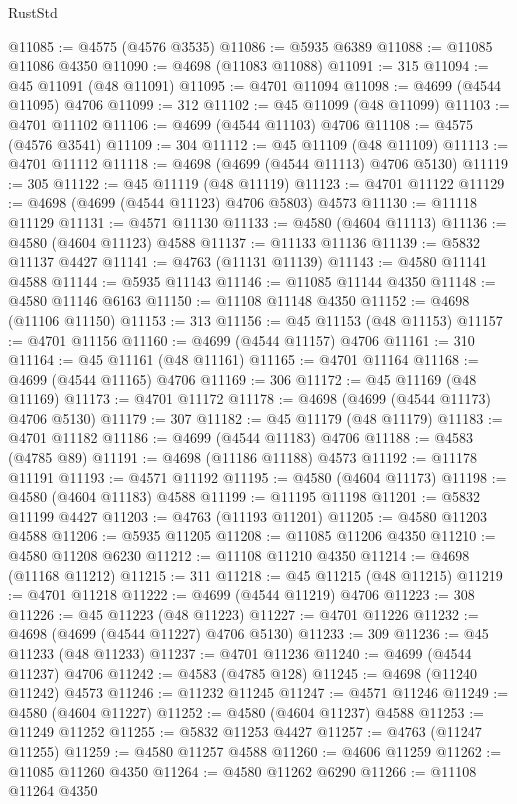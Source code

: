 \begin{lexlean}{RustStd}
\begin{coremodule}
@11085 := @4575 (@4576 @3535)
@11086 := @5935 @6389
@11088 := @11085 @11086 @4350
@11090 := @4698 (@11083 @11088)
@11091 := 315
@11094 := @45 @11091 (@48 @11091)
@11095 := @4701 @11094
@11098 := @4699 (@4544 @11095) @4706
@11099 := 312
@11102 := @45 @11099 (@48 @11099)
@11103 := @4701 @11102
@11106 := @4699 (@4544 @11103) @4706
@11108 := @4575 (@4576 @3541)
@11109 := 304
@11112 := @45 @11109 (@48 @11109)
@11113 := @4701 @11112
@11118 := @4698 (@4699 (@4544 @11113) @4706 @5130)
@11119 := 305
@11122 := @45 @11119 (@48 @11119)
@11123 := @4701 @11122
@11129 := @4698 (@4699 (@4544 @11123) @4706 @5803) @4573
@11130 := @11118 @11129
@11131 := @4571 @11130
@11133 := @4580 (@4604 @11113)
@11136 := @4580 (@4604 @11123) @4588
@11137 := @11133 @11136
@11139 := @5832 @11137 @4427
@11141 := @4763 (@11131 @11139)
@11143 := @4580 @11141 @4588
@11144 := @5935 @11143
@11146 := @11085 @11144 @4350
@11148 := @4580 @11146 @6163
@11150 := @11108 @11148 @4350
@11152 := @4698 (@11106 @11150)
@11153 := 313
@11156 := @45 @11153 (@48 @11153)
@11157 := @4701 @11156
@11160 := @4699 (@4544 @11157) @4706
@11161 := 310
@11164 := @45 @11161 (@48 @11161)
@11165 := @4701 @11164
@11168 := @4699 (@4544 @11165) @4706
@11169 := 306
@11172 := @45 @11169 (@48 @11169)
@11173 := @4701 @11172
@11178 := @4698 (@4699 (@4544 @11173) @4706 @5130)
@11179 := 307
@11182 := @45 @11179 (@48 @11179)
@11183 := @4701 @11182
@11186 := @4699 (@4544 @11183) @4706
@11188 := @4583 (@4785 @89)
@11191 := @4698 (@11186 @11188) @4573
@11192 := @11178 @11191
@11193 := @4571 @11192
@11195 := @4580 (@4604 @11173)
@11198 := @4580 (@4604 @11183) @4588
@11199 := @11195 @11198
@11201 := @5832 @11199 @4427
@11203 := @4763 (@11193 @11201)
@11205 := @4580 @11203 @4588
@11206 := @5935 @11205
@11208 := @11085 @11206 @4350
@11210 := @4580 @11208 @6230
@11212 := @11108 @11210 @4350
@11214 := @4698 (@11168 @11212)
@11215 := 311
@11218 := @45 @11215 (@48 @11215)
@11219 := @4701 @11218
@11222 := @4699 (@4544 @11219) @4706
@11223 := 308
@11226 := @45 @11223 (@48 @11223)
@11227 := @4701 @11226
@11232 := @4698 (@4699 (@4544 @11227) @4706 @5130)
@11233 := 309
@11236 := @45 @11233 (@48 @11233)
@11237 := @4701 @11236
@11240 := @4699 (@4544 @11237) @4706
@11242 := @4583 (@4785 @128)
@11245 := @4698 (@11240 @11242) @4573
@11246 := @11232 @11245
@11247 := @4571 @11246
@11249 := @4580 (@4604 @11227)
@11252 := @4580 (@4604 @11237) @4588
@11253 := @11249 @11252
@11255 := @5832 @11253 @4427
@11257 := @4763 (@11247 @11255)
@11259 := @4580 @11257 @4588
@11260 := @4606 @11259
@11262 := @11085 @11260 @4350
@11264 := @4580 @11262 @6290
@11266 := @11108 @11264 @4350

\end{coremodule}
\end{lexlean}
